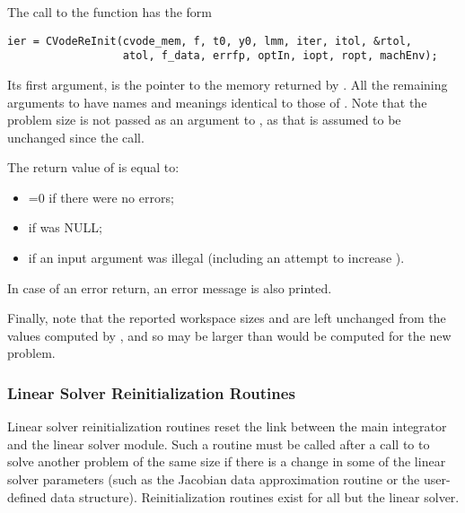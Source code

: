 The call to the  function has the form
\begin{verbatim}
ier = CVodeReInit(cvode_mem, f, t0, y0, lmm, iter, itol, &rtol, 
                  atol, f_data, errfp, optIn, iopt, ropt, machEnv);
\end{verbatim}
Its first argument,  is the pointer to the {\cvode}
memory returned by .
All the remaining arguments to  have names and         
meanings identical to those of .  Note that the     
problem size  is not passed as an argument to ,       
as that is assumed to be unchanged since the  call. 

The return value  of  is equal to: 
\begin{itemize}
\item {}=0 if there were no errors; 
\item {} if  was NULL;
\item {} if an input argument was illegal    
      (including an attempt to increase ).
\end{itemize}
In case of an error return, an error message is also printed.  

Finally, note that the reported workspace sizes \id{[LENRW]} 
and \id{[LENIW]} are left unchanged from the values computed 
by , and so may be larger than would be computed for 
the new problem.

\subsubsection{Linear Solver Reinitialization Routines}\label{sss:lin_solv_reinit}

Linear solver reinitialization routines reset the link between the main {\cvode}
integrator and the linear solver module. Such a routine must be called after a call
to  to solve another problem of the same size if there is a change
in some of the linear solver parameters (such as the Jacobian data approximation
routine or the user-defined data structure). Reinitialization routines exist for
all but the {\cvdiag} linear solver.


